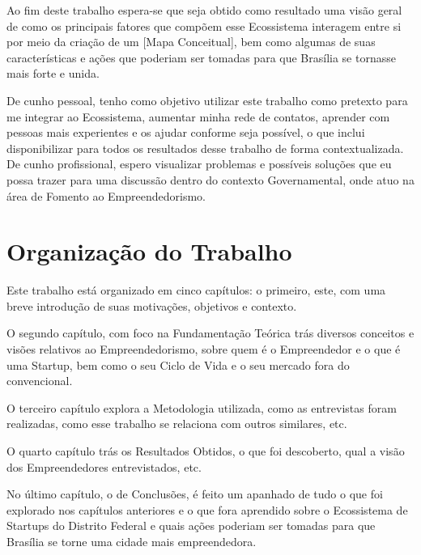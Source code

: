 Ao fim deste trabalho espera-se que seja obtido como resultado uma visão geral de como os principais fatores que compõem esse Ecossistema interagem entre si por meio da criação de um [Mapa Conceitual], bem como algumas de suas características e ações que poderiam ser tomadas para que Brasília se tornasse mais forte e unida.

De cunho pessoal, tenho como objetivo utilizar este trabalho como pretexto para me integrar ao Ecossistema, aumentar minha rede de contatos, aprender com pessoas mais experientes e os ajudar conforme seja possível, o que inclui disponibilizar para todos os resultados desse trabalho de forma contextualizada. De cunho profissional, espero visualizar problemas e possíveis soluções que eu possa trazer para uma discussão dentro do contexto Governamental, onde atuo na área de Fomento ao Empreendedorismo.

\section{Organização do Trabalho}
\label{section:organizacao_do_trabalho}

Este trabalho está organizado em cinco capítulos: o primeiro, este, com uma breve introdução de suas motivações, objetivos e contexto. 

O segundo capítulo, com foco na Fundamentação Teórica trás diversos conceitos e visões relativos ao Empreendedorismo, sobre quem é o Empreendedor e o que é uma Startup, bem como o seu Ciclo de Vida e o seu mercado fora do convencional. 

O terceiro capítulo explora a Metodologia utilizada, como as entrevistas foram realizadas, como esse trabalho se relaciona com outros similares, etc. 

O quarto capítulo trás os Resultados Obtidos, o que foi descoberto, qual a visão dos Empreendedores entrevistados, etc.

No último capítulo, o de Conclusões, é feito um apanhado de tudo o que foi explorado nos capítulos anteriores e o que fora aprendido sobre o Ecossistema de Startups do Distrito Federal e quais ações poderiam ser tomadas para que Brasília se torne uma cidade mais empreendedora.